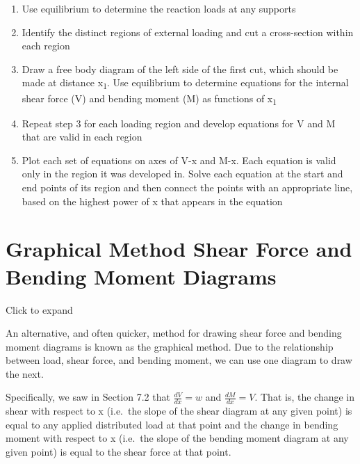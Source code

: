 \documentclass[
  letterpaper,
  DIV=11,
  numbers=noendperiod]{scrreprt}
\theoremstyle{definition}
\theoremstyle{remark}
\begin{document}
\begin{tcolorbox}[enhanced jigsaw, leftrule=.75mm, colbacktitle=quarto-callout-warning-color!10!white, breakable, opacityback=0, colback=white, titlerule=0mm, toprule=.15mm, colframe=quarto-callout-warning-color-frame, coltitle=black, title={Step-by-step: Shear Force and Bending Moment Diagrams (Equilibrium
Method)}, toptitle=1mm, bottomrule=.15mm, rightrule=.15mm, left=2mm, arc=.35mm, opacitybacktitle=0.6, bottomtitle=1mm]

\begin{enumerate}
\def\labelenumi{\arabic{enumi}.}
\item
  Use equilibrium to determine the reaction loads at any supports
\item
  Identify the distinct regions of external loading and cut a
  cross-section within each region
\item
  Draw a free body diagram of the left side of the first cut, which
  should be made at distance x\textsubscript{1}. Use equilibrium to
  determine equations for the internal shear force (V) and bending
  moment (M) as functions of x\textsubscript{1}
\item
  Repeat step 3 for each loading region and develop equations for V and
  M that are valid in each region
\item
  Plot each set of equations on axes of V-x and M-x. Each equation is
  valid only in the region it was developed in. Solve each equation at
  the start and end points of its region and then connect the points
  with an appropriate line, based on the highest power of x that appears
  in the equation
\end{enumerate}

\end{tcolorbox}

\section{Graphical Method Shear Force and Bending Moment
Diagrams}\label{sec-7.4}

Click to expand

An alternative, and often quicker, method for drawing shear force and
bending moment diagrams is known as the graphical method. Due to the
relationship between load, shear force, and bending moment, we can use
one diagram to draw the next.

Specifically, we saw in Section 7.2 that \(\frac{dV}{dx}=w\) and
\(\frac{dM}{dx}=V\). That is, the change in shear with respect to x
(i.e.~the slope of the shear diagram at any given point) is equal to any
applied distributed load at that point and the change in bending moment
with respect to x (i.e.~the slope of the bending moment diagram at any
given point) is equal to the shear force at that point.
\end{document}
